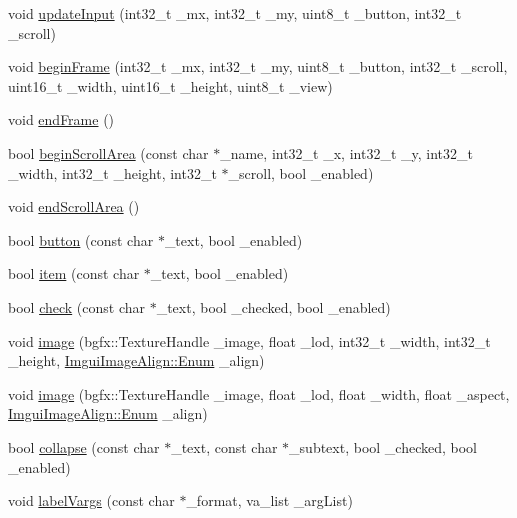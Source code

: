 \begin{DoxyCompactItemize}
void \hyperlink{struct_imgui_ac9ead12c0619dd2bde67c40e7076160b}{update\+Input} (int32\+\_\+t \+\_\+mx, int32\+\_\+t \+\_\+my, uint8\+\_\+t \+\_\+button, int32\+\_\+t \+\_\+scroll)
\item 
void \hyperlink{struct_imgui_aace2d3cc1a44dde2a6ecaa10c20ae75e}{begin\+Frame} (int32\+\_\+t \+\_\+mx, int32\+\_\+t \+\_\+my, uint8\+\_\+t \+\_\+button, int32\+\_\+t \+\_\+scroll, uint16\+\_\+t \+\_\+width, uint16\+\_\+t \+\_\+height, uint8\+\_\+t \+\_\+view)
\item 
void \hyperlink{struct_imgui_a8f7e51edd72634a86fdaad6a8e92fbcd}{end\+Frame} ()
\item 
bool \hyperlink{struct_imgui_aa842ced9a03d6ce04db52db1998dbe8b}{begin\+Scroll\+Area} (const char $\ast$\+\_\+name, int32\+\_\+t \+\_\+x, int32\+\_\+t \+\_\+y, int32\+\_\+t \+\_\+width, int32\+\_\+t \+\_\+height, int32\+\_\+t $\ast$\+\_\+scroll, bool \+\_\+enabled)
\item 
void \hyperlink{struct_imgui_a7906bd24dcf421288849809931c705a6}{end\+Scroll\+Area} ()
\item 
bool \hyperlink{struct_imgui_a4a85db7180a0eef035ead4360f51d8ff}{button} (const char $\ast$\+\_\+text, bool \+\_\+enabled)
\item 
bool \hyperlink{struct_imgui_ae577ae044217d48a9ab28c72733c25a1}{item} (const char $\ast$\+\_\+text, bool \+\_\+enabled)
\item 
bool \hyperlink{struct_imgui_a499361b2a207851a37a9122851851588}{check} (const char $\ast$\+\_\+text, bool \+\_\+checked, bool \+\_\+enabled)
\item 
void \hyperlink{struct_imgui_a5a23206faeeb15a7e311854f159b5c2a}{image} (bgfx\+::\+Texture\+Handle \+\_\+image, float \+\_\+lod, int32\+\_\+t \+\_\+width, int32\+\_\+t \+\_\+height, \hyperlink{struct_imgui_image_align_a5f02ce5e32468b0d112123cf21437313}{Imgui\+Image\+Align\+::\+Enum} \+\_\+align)
\item 
void \hyperlink{struct_imgui_a125c7cc9f698979111889fd3c532968f}{image} (bgfx\+::\+Texture\+Handle \+\_\+image, float \+\_\+lod, float \+\_\+width, float \+\_\+aspect, \hyperlink{struct_imgui_image_align_a5f02ce5e32468b0d112123cf21437313}{Imgui\+Image\+Align\+::\+Enum} \+\_\+align)
\item 
bool \hyperlink{struct_imgui_a79fc0ef2e155f87c65cc91833acc4a09}{collapse} (const char $\ast$\+\_\+text, const char $\ast$\+\_\+subtext, bool \+\_\+checked, bool \+\_\+enabled)
\item 
void \hyperlink{struct_imgui_a3625fb9706dd9c5c976f137024f1fe94}{label\+Vargs} (const char $\ast$\+\_\+format, va\+\_\+list \+\_\+arg\+List)

\end{DoxyCompactItemize}
